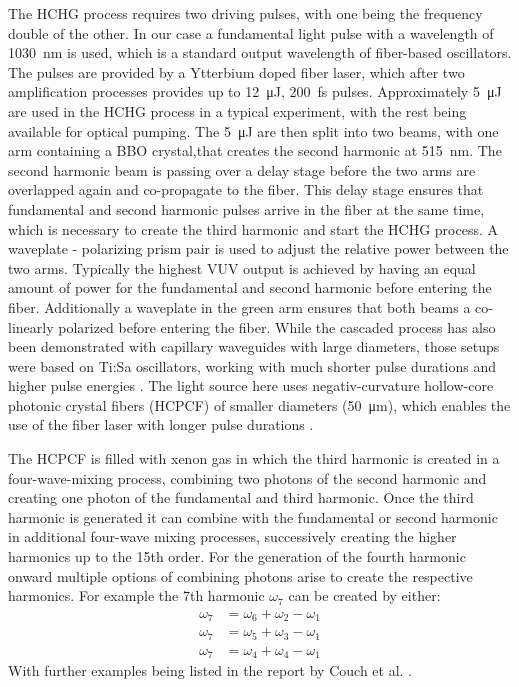 The HCHG process requires two driving pulses, with one being the frequency double of the other.
In our case a fundamental light pulse with a wavelength of \qty{1030}{\nano\meter} is used, which is a standard output wavelength of fiber-based oscillators.
The pulses are provided by a Ytterbium doped fiber laser, which after two amplification processes provides up to \qty{12}{\micro\joule}, \qty{200}{\femto\second} pulses.
Approximately \qty{5}{\micro\joule} are used in the HCHG process in a typical experiment, with the rest being available for optical pumping.
The \qty{5}{\micro\joule} are then split into two beams, with one arm containing a BBO crystal,that creates the second harmonic at \qty{515}{\nano\meter}.
The second harmonic beam is passing over a delay stage before the two arms are overlapped again and co-propagate to the fiber.
This delay stage ensures that fundamental and second harmonic pulses arrive in the fiber at the same time, which is necessary to create the third harmonic and start the HCHG process.
A waveplate - polarizing prism pair is used to adjust the relative power between the two arms.
Typically the highest VUV output is achieved by having an equal amount of power for the fundamental and second harmonic before entering the fiber.
Additionally a waveplate in the green arm ensures that both beams a co-linearly polarized before entering the fiber.
While the cascaded process has also been demonstrated with capillary waveguides with large diameters, those setups were based on Ti:Sa oscillators, working with much shorter pulse durations and higher pulse energies \cite{misoguti_generation_2001,durfee_phase_2002,misoguti_nonlinear_2005}.
The light source here uses negativ-curvature hollow-core photonic crystal fibers (HCPCF) of smaller diameters (\qty{50}{\micro\meter}), which enables the use of the fiber laser with longer pulse durations \cite{couch_ultrafast_2020}.

The HCPCF is filled with xenon gas in which the third harmonic is created in a four-wave-mixing process, combining two photons of the second harmonic and creating one photon of the fundamental and third harmonic.
Once the third harmonic is generated it can combine with the fundamental or second harmonic in additional four-wave mixing processes, successively creating the higher harmonics up to the 15th order.
For the generation of the fourth harmonic onward multiple options of combining photons arise to create the respective harmonics.
For example the 7th harmonic $\omega_7$ can be created by either:
\begin{equation}
\begin{aligned}
	\omega_7 &= \omega_6 + \omega_2 - \omega_1 \\
	\omega_7 &= \omega_5 + \omega_3 - \omega_1 \\
	\omega_7 &= \omega_4 + \omega_4 - \omega_1
\end{aligned}
\label{eq:vuv_pathway}
\end{equation}
With further examples being listed in the report by Couch et al. \cite{couch_ultrafast_2020}.

